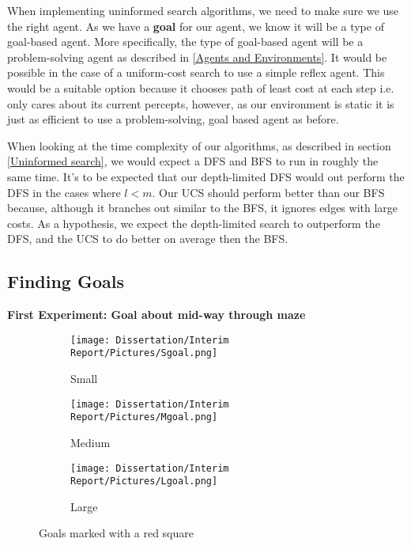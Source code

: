 \documentclass[]{final_report}
\begin{document}
When implementing uninformed search algorithms, we need to make sure we use the right agent. As we have a \textbf{goal} for our agent, we know it will be a type of goal-based agent. More specifically, the type of goal-based agent will be a problem-solving agent as described in \ref{Agents and Environments}. It would be possible in the case of a uniform-cost search to use a simple reflex agent. This would be a suitable option because it chooses path of least cost at each step i.e. only cares about its current percepts, however, as our environment is static it is just as efficient to use a problem-solving, goal based agent as before.

When looking at the time complexity of our algorithms, as described in section \ref{Uninformed search}, we would expect a DFS and BFS to run in roughly the same time. It's to be expected that our depth-limited DFS would out perform the DFS in the cases where $l < m$. Our UCS should perform better than our BFS because, although it branches out similar to the BFS, it ignores edges with large costs. As a hypothesis, we expect the depth-limited search to outperform the DFS, and the UCS to do better on average then the BFS. 

\subsection{Finding Goals}\label{Finding Goals}
\textbf{First Experiment: Goal about mid-way through maze}
\begin{figure}[h]
     \centering
     \begin{subfigure}[h]{0.3\textwidth}
         \centering
         \texttt{[image: Dissertation/Interim Report/Pictures/Sgoal.png]}
         \caption*{Small}
     \end{subfigure}
     \hfill
     \begin{subfigure}[h]{0.3\textwidth}
         \centering
         \texttt{[image: Dissertation/Interim Report/Pictures/Mgoal.png]}
         \caption*{Medium}
     \end{subfigure}
     \hfill
     \begin{subfigure}[h]{0.3\textwidth}
         \centering
         \texttt{[image: Dissertation/Interim Report/Pictures/Lgoal.png]}
         \caption*{Large}
     \end{subfigure}
        \caption{Goals marked with a red square}
        \label{fig:three graphs}
\end{figure}
\end{document}
